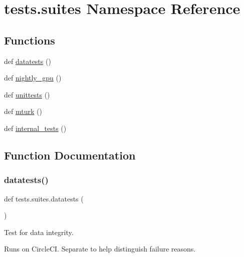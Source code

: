 \hypertarget{namespacetests_1_1suites}{}\section{tests.\+suites Namespace Reference}
\label{namespacetests_1_1suites}
\subsection*{Functions}
\begin{DoxyCompactItemize}
\item 
def \hyperlink{namespacetests_1_1suites_a1e7ee73a4d3645058850bc743ad6b668}{datatests} ()
\item 
def \hyperlink{namespacetests_1_1suites_ab1df665f54fccb5bbceb95cf8e4498b9}{nightly\+\_\+gpu} ()
\item 
def \hyperlink{namespacetests_1_1suites_a02a7d577493ceb024319292b96e13265}{unittests} ()
\item 
def \hyperlink{namespacetests_1_1suites_a5d5a0bb14f72dd9c86a97cc6ca6add87}{mturk} ()
\item 
def \hyperlink{namespacetests_1_1suites_aaa84dd961fb392c540b3a116119be21c}{internal\+\_\+tests} ()
\end{DoxyCompactItemize}


\subsection{Function Documentation}
\mbox{\label{namespacetests_1_1suites_a1e7ee73a4d3645058850bc743ad6b668}} 
\subsubsection{\texorpdfstring{datatests()}{datatests()}}
{\footnotesize\ttfamily def tests.\+suites.\+datatests (\begin{DoxyParamCaption}{ }\end{DoxyParamCaption})}

\begin{DoxyVerb}Test for data integrity.

Runs on CircleCI. Separate to help distinguish failure reasons.
\end{DoxyVerb}
 \mbox{\label{namespacetests_1_1suites_aaa84dd961fb392c540b3a116119be21c}} 
